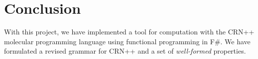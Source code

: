 \section{Conclusion}
With this project, we have implemented a tool for computation with the CRN++ molecular programming language using functional programming in F\#. We have formulated a revised grammar for CRN++ and a set of \textit{well-formed} properties. 
 
